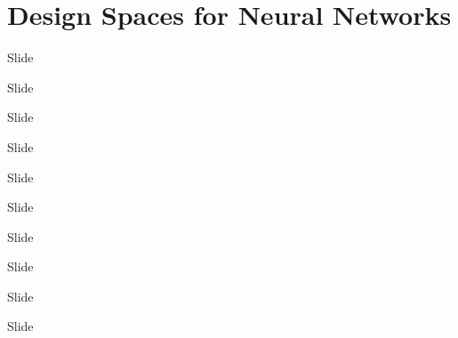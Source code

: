 \section{Design Spaces for Neural Networks}
\begin{frame}[c]{Slide}


\end{frame}
\begin{frame}[c]{Slide}


\end{frame}
\begin{frame}[c]{Slide}


\end{frame}
\begin{frame}[c]{Slide}


\end{frame}
\begin{frame}[c]{Slide}


\end{frame}
\begin{frame}[c]{Slide}


\end{frame}
\begin{frame}[c]{Slide}


\end{frame}
\begin{frame}[c]{Slide}


\end{frame}
\begin{frame}[c]{Slide}


\end{frame}
\begin{frame}[c]{Slide}


\end{frame}

